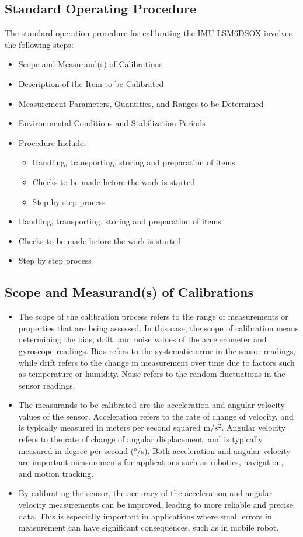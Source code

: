 \subsection{Standard Operating Procedure}
The standard operation procedure for calibrating the IMU LSM6DSOX involves the following steps:

\begin{itemize}
	\item Scope and Measurand(s) of Calibrations 
	\item Description of the Item to be Calibrated
	\item Measurement Parameters, Quantities, and Ranges to be Determined 
	\item Environmental Conditions and Stabilization Periods 
	\item Procedure Include:
	\begin{itemize}
		\item Handling, transporting, storing and preparation of items
		\item Checks to be made before the work is started
		\item  Step by step process
	\end{itemize}
	\item Handling, transporting, storing and preparation of items
	\item Checks to be made before the work is started
	\item Step by step process 
\end{itemize}

\subsection{Scope and Measurand(s) of Calibrations}

\begin{itemize}
	\item The scope of the calibration process refers to the range of measurements or properties that are being assessed. In this case, the scope of calibration means determining the bias, drift, and noise values of the accelerometer and gyroscope readings. Bias refers to the systematic error in the sensor readings, while drift refers to the change in measurement over time due to factors such as temperature or humidity. Noise refers to the random fluctuations in the sensor readings.
	\item The measurands to be calibrated are the acceleration and angular velocity values of the sensor. Acceleration refers to the rate of change of velocity, and is typically measured in meters per second squared m/\(s^2\). Angular velocity refers to the rate of change of angular displacement, and is typically measured in degree per second (°/s). Both acceleration and angular velocity are important measurements for applications such as robotics, navigation, and motion tracking.
	\item By calibrating the sensor, the accuracy of the acceleration and angular velocity measurements can be improved, leading to more reliable and precise data. This is especially important in applications where small errors in measurement can have significant consequences, such as in mobile robot.
\end{itemize}

